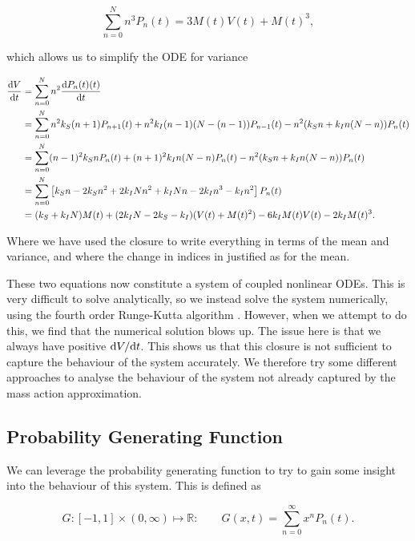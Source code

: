 \documentclass[12pt,a4paper,openany,twoside]{book}
\renewcommand{\d}{{\mathrm d}}
\newcommand{\fd}[2]{\mathchoice{\frac{\d #1}{\d #2}}{\d #1/\d #2}{\d #1/\d #2}{\d #1/\d #2}}
\begin{document}
\begin{equation}
	\sum_{n = 0}^N n^3 P_n(t) = 3 M(t) V(t) + M(t)^3,
\end{equation}

which allows us to simplify the ODE for variance

\begin{equation}
\begin{aligned}
	\fd{V}{t} &= \sum_{n = 0}^N n^2 \fd {P_n(t)(t)}{t} \\
	&= \sum_{n = 0}^N n^2 k_S (n+1) P_{n+1}(t) + n^2 k_I (n-1) (N - (n-1)) P_{n-1} (t) - n^2 (k_S n + k_I n (N - n)) P_n(t) \\
	&= \sum_{n = 0}^N (n-1)^2 k_S n P_n(t) + (n+1)^2 k_I n (N-n) P_n(t) - n^2 (k_S n + k_I n (N - n)) P_n(t) \\
	&= \sum_{n=0}^N \left[ k_S n - 2 k_S n^2 + 2 k_I N n^2  + k_I N n - 2 k_I n^3 - k_I n^2 \right] P_n(t) \\
	&= (k_S + k_I N) M(t) + (2k_I N - 2k_S - k_I) (V(t) + M(t)^2)  - 6 k_I M(t) V(t) - 2 k_I M(t)^3.
\end{aligned}	
\end{equation}

Where we have used the closure to write everything in terms of the mean and variance, and where the change in indices in justified as for the mean.

These two equations now constitute a system of coupled nonlinear ODEs. This is very difficult to solve analytically, so we instead solve the system numerically, using the fourth order Runge-Kutta algorithm \citep{cheeverFourthOrderRungeKutta}. However, when we attempt to do this, we find that the numerical solution blows up. The issue here is that we always have positive $\fd V t$. This shows us that this closure is not sufficient to capture the behaviour of the system accurately. We therefore try some different approaches to analyse the behaviour of the system not already captured by the mass action approximation.

\subsection{Probability Generating Function}

We can leverage the probability generating function to try to gain some insight into the behaviour of this system. This is defined as

\begin{equation}
	G: [-1, 1] \times (0, \infty) \mapsto \mathbb{R}: \qquad G(x, t) = \sum_{n=0}^\infty x^n P_n(t). \label{PGFdef}
\end{equation}
\end{document}
